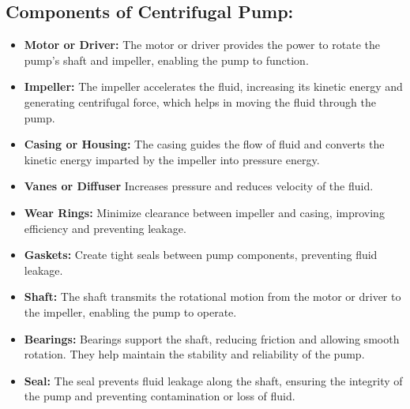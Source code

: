 \documentclass[12pt]{article}
\begin{document}
\subsection*{Components of Centrifugal Pump:}
\begin{itemize}
  \item \textbf{Motor or Driver:} The motor or driver provides the power to rotate the pump's shaft and impeller, enabling the pump to function.
  
  \item \textbf{Impeller:} The impeller accelerates the fluid, increasing its kinetic energy and generating centrifugal force, which helps in moving the fluid through the pump.
  \item \textbf{Casing or Housing:} The casing guides the flow of fluid and converts the kinetic energy imparted by the impeller into pressure energy.
  \item \textbf{Vanes or Diffuser} Increases pressure and reduces velocity of the fluid.
  
  \item \textbf{Wear Rings:} Minimize clearance between impeller and casing, improving efficiency and preventing leakage.
  \item \textbf{Gaskets:} Create tight seals between pump components, preventing fluid leakage.
  
  \item \textbf{Shaft:} The shaft transmits the rotational motion from the motor or driver to the impeller, enabling the pump to operate.
  
  \item \textbf{Bearings:} Bearings support the shaft, reducing friction and allowing smooth rotation. They help maintain the stability and reliability of the pump.
  
  \item \textbf{Seal:} The seal prevents fluid leakage along the shaft, ensuring the integrity of the pump and preventing contamination or loss of fluid.
  
\end{itemize}
\end{document}

